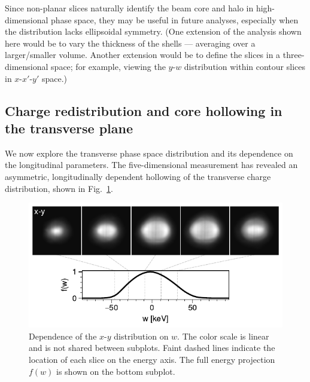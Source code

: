 \documentclass[%
 reprint,
 amsmath,amssymb,
 aps,
prstab,
]{revtex4-2}
\begin{document}
Since non-planar slices naturally identify the beam core and halo in high-dimensional phase space, they may be useful in future analyses, especially when the distribution lacks ellipsoidal symmetry. (One extension of the analysis shown here would be to vary the thickness of the shells --- averaging over a larger/smaller volume. Another extension would be to define the slices in a three-dimensional space; for example, viewing the $y$-$w$ distribution within contour slices in $x$-$x'$-$y'$ space.)



\subsection{Charge redistribution and core hollowing in the transverse plane}\label{sec:results-b}

We now explore the transverse phase space distribution and its dependence on the longitudinal parameters. The five-dimensional measurement has revealed an asymmetric, longitudinally dependent hollowing of the transverse charge distribution, shown in Fig.~\ref{fig:wslices}.
%
\begin{figure}
    \centering
    \includegraphics[width=\columnwidth]{fig_xyw.pdf}
    \caption{Dependence of the $x$-$y$ distribution on $w$. The color scale is linear and is not shared between subplots. Faint dashed lines indicate the location of each slice on the energy axis. The full energy projection $f(w)$ is shown on the bottom subplot.}
    \label{fig:wslices}
\end{figure}
%
\end{document}
